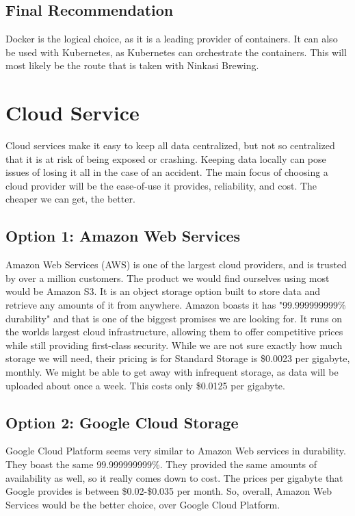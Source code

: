 \documentclass[10pt, draftclsnofoot, journal, onecolumn]{IEEEtran}
\begin{document}
        \subsection{Final Recommendation}
        Docker is the logical choice, as it is a leading provider of containers. It can also be used with Kubernetes, as Kubernetes can orchestrate the containers. This will most likely be the route that is taken with Ninkasi Brewing.
        
\section{Cloud Service}
    Cloud services make it easy to keep all data centralized, but not so centralized that it is at risk of being exposed or crashing. Keeping data locally can pose issues of losing it all in the case of an accident. The main focus of choosing a cloud provider will be the ease-of-use it provides, reliability, and cost. The cheaper we can get, the better. 
    
    \subsection{Option 1: Amazon Web Services}
        Amazon Web Services (AWS) is one of the largest cloud providers, and is trusted by over a million customers. The product we would find ourselves using most would be Amazon S3. It is an object storage option built to store data and retrieve any amounts of it from anywhere. Amazon boasts it has "99.999999999\% durability" \cite{aws} and that is one of the biggest promises we are looking for. It runs on the worlds largest cloud infrastructure, allowing them to offer competitive prices while still providing first-class security. While we are not sure exactly how much storage we will need, their pricing is for Standard Storage is \$0.0023 per gigabyte, monthly. We might be able to get away with infrequent storage, as data will be uploaded about once a week. This costs only \$0.0125 per gigabyte. 
        
    \subsection{Option 2: Google Cloud Storage}
        Google Cloud Platform seems very similar to Amazon Web services in durability. They boast the same 99.999999999\%. \cite{google} They provided the same amounts of availability as well, so it really comes down to cost. The prices per gigabyte that Google provides is between \$0.02-\$0.035 per month. So, overall, Amazon Web Services would be the better choice, over Google Cloud Platform.
        
\end{document}
